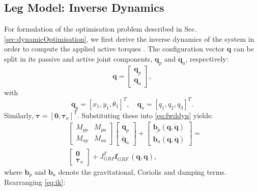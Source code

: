 \documentclass[letterpaper, 10 pt, conference]{ieeeconf}  %
\begin{document}
\subsection{Leg Model: Inverse Dynamics}
For formulation of the optimisation problem described in Sec. \ref{sec:dynamicOptimisation}, we first derive the inverse dynamics of the system in order to compute the applied active torques \cite{nakanishi2007inverse}. The configuration vector $\mathbf{q}$ can be split in its passive and active joint components, $\mathbf{q}_p$ and $\mathbf{q}_a$, respectively:
\begin{equation}
\mathbf{q} =
\begin{bmatrix}
	\mathbf{q}_p \\
	\mathbf{q}_a
\end{bmatrix},
\end{equation}
with
\begin{equation}
	\mathbf{q}_p = [x_1,y_1,\theta_1]^T, \quad  
	\mathbf{q}_a = [q_1,q_2,q_3]^T.
\end{equation}
\noindent
Similarly, $\boldsymbol{\tau} = \left[\mathbf{0},\boldsymbol{\tau}_a\right]^T$. Substituting these into \eqref{eq:fwddyn} yields:
\begin{equation}
	\begin{aligned}
		&\left[\begin{array}{cc}  
		M_{pp} & M_{pa}\\
		M_{ap} & M_{aa}
		\end{array} \right]
		\left[\begin{array}{c}  
		\mathbf{\ddot q}_p\\
		\mathbf{\ddot q}_a
		\end{array} \right] +
		\left[\begin{array}{c}  
		\mathbf{b}_p \mathbf{(q,\dot q)}\\
		\mathbf{b}_a \mathbf{(q,\dot q)}
		\end{array} \right] 
		=\\
		&\left[\begin{array}{c}  
		\mathbf{0}\\
		\boldsymbol{\tau}_a
		\end{array} \right] 
		+
		J_{GRF}^T \mathbf{f}_{GRF} \, \mathbf{(q, \dot q)},
	\end{aligned}
	\label{eq:ik}
\end{equation}		
where $\mathbf{b}_p$ and $\mathbf{b}_a$ denote the gravitational, Coriolis and damping terms. 
Rearranging \eqref{eq:ik}:
\end{document}
